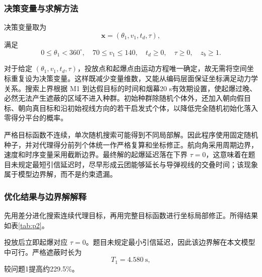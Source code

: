 \documentclass[12pt,a4paper]{ctexart}
\begin{document}
\subsubsection{决策变量与求解方法}

决策变量取为
\begin{equation}
\bm x=(\theta_1,v_1,t_d,\tau),
\end{equation}
满足
\begin{equation}
0\le\theta_1<360^\circ,\quad70\le v_1\le140,\quad
t_d\ge0,\quad\tau\ge0,\quad z_b\ge1.
\end{equation}

对于给定 $(\theta_1,v_1,t_d,\tau)$，投放点和起爆点由运动方程唯一确定，故无需将空间坐标重复设为决策变量。这样既减少变量维数，又能从编码层面保证坐标满足动力学关系。搜索上界根据 M1 到达假目标的时间和烟幕20 s有效期设置，使起爆过晚、必然无法产生遮蔽的区域不进入种群。初始种群除随机个体外，还加入朝向假目标、朝向真目标和沿初始视线方向的若干启发式个体，以降低完全随机初始化落入零得分平台的概率。

严格目标函数不连续，单次随机搜索可能得到不同局部解。因此程序使用固定随机种子，并对代理得分前列个体统一作严格复算和坐标修正。航向角采用周期边界，速度和时序变量采用截断边界。最终解的起爆延迟落在下界 $\tau=0$，这意味着在题目未规定最短引信延迟时，尽早形成云团能够延长与导弹视线的交叠时间；该现象属于模型边界解，而不是约束遗漏。

\subsubsection{优化结果与边界解解释}
先用差分进化搜索连续代理目标，再用完整目标函数进行坐标局部修正。所得结果如表\ref{tab:p2}。

\begin{table}[H]
\centering
\caption{问题2最优投放参数}
\label{tab:p2}
\end{table}

投放后立即起爆对应 $\tau=0$。题目未规定最小引信延迟，因此该边界解在本文模型中可行。严格遮蔽时长为
\begin{equation}
\boxed{T_1=4.580\ \mathrm{s}},
\end{equation}
较问题1提高约229.5\%。
\end{document}
